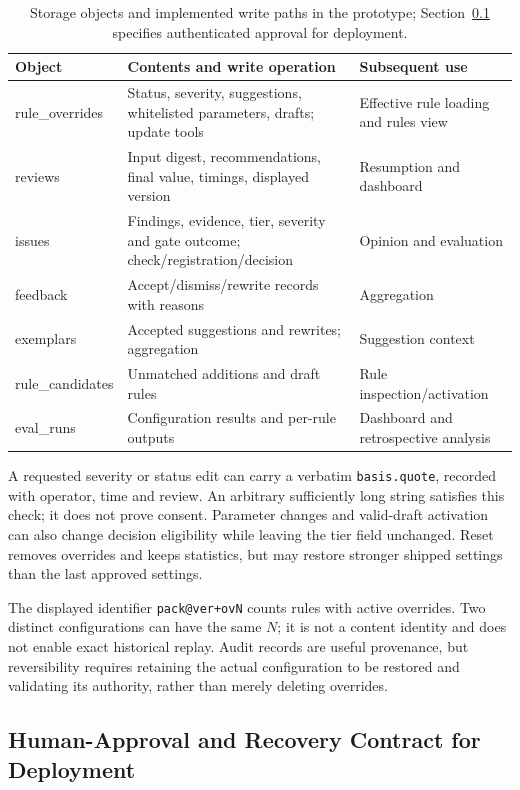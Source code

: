 \documentclass[computers,article,submit,moreauthors]{Definitions/mdpi}
\begin{document}
\begin{table}[!ht]
\caption{Storage objects and implemented write paths in the prototype; Section~\ref{sec:contract} specifies authenticated approval for deployment.}
\label{tab:storage}
\centering\footnotesize
\begin{tabularx}{\textwidth}{@{}p{3cm}XX@{}}
\toprule
Object & Contents and write operation & Subsequent use \\
\midrule
rule\_overrides & Status, severity, suggestions, whitelisted parameters, drafts; update tools & Effective rule loading and rules view \\
reviews & Input digest, recommendations, final value, timings, displayed version & Resumption and dashboard \\
issues & Findings, evidence, tier, severity and gate outcome; check/registration/decision & Opinion and evaluation \\
feedback & Accept/dismiss/rewrite records with reasons & Aggregation \\
exemplars & Accepted suggestions and rewrites; aggregation & Suggestion context \\
rule\_candidates & Unmatched additions and draft rules & Rule inspection/activation \\
eval\_runs & Configuration results and per-rule outputs & Dashboard and retrospective analysis \\
\bottomrule
\end{tabularx}
\end{table}

A requested severity or status edit can carry a verbatim \texttt{basis.quote}, recorded with operator, time and review. An arbitrary sufficiently long string satisfies this check; it does not prove consent. Parameter changes and valid-draft activation can also change decision eligibility while leaving the tier field unchanged. Reset removes overrides and keeps statistics, but may restore stronger shipped settings than the last approved settings.

The displayed identifier \texttt{pack@ver+ovN} counts rules with active overrides. Two distinct configurations can have the same $N$; it is not a content identity and does not enable exact historical replay. Audit records are useful provenance, but reversibility requires retaining the actual configuration to be restored and validating its authority, rather than merely deleting overrides.

\subsection{Human-Approval and Recovery Contract for Deployment}\label{sec:contract}
\end{document}
